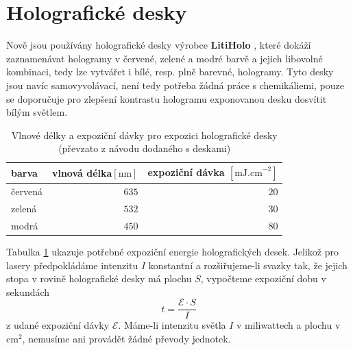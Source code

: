 \documentclass[twoside,project]{../MFFPrace}
\begin{document}
\section{Holografické desky}
Nově jsou používány holografické desky výrobce \textbf{LitiHolo} \cite{litiholo}, které dokáží zaznamenávat hologramy v červené, zelené a modré barvě a jejich libovolné kombinaci, tedy lze vytvářet i bílé, resp. plně barevné, hologramy. Tyto desky jsou navíc samovyvolávací, není tedy potřeba žádná práce s chemikáliemi, pouze se doporučuje pro zlepšení kontrastu hologramu exponovanou desku dosvítit bílým světlem.

\begin{table}
    \caption{Vlnové délky a expoziční dávky pro expozici holografické desky (převzato z návodu dodaného s deskami)}
    \centering
    \begin{tabular}{|l|r|r|}
        \hline
        \textbf{barva} & \textbf{vlnová délka}\footnotemark[1] $\left[\text{nm}\right]$ & \textbf{expoziční dávka} $\left[\text{mJ.cm}^{-2}\right]$ \\
        \hline
        červená        & $635$                                                          & $20$                                                      \\
        zelená         & $532$                                                          & $30$                                                      \\
        modrá          & $450$                                                          & $80$                                                      \\
        \hline
    \end{tabular}
    \label{tbl:expozicni-davky}
\end{table}

Tabulka \ref{tbl:expozicni-davky} ukazuje potřebné expoziční energie holografických desek. Jelikož pro lasery předpokládáme intenzitu $I$ konstantní a rozšiřujeme-li svazky tak, že jejich stopa v rovině holografické desky má plochu $S$, vypočteme expoziční dobu v sekundách
\begin{equation}
    t=\frac{\mathcal{E}\cdot S}{I}
    \label{eqn:expozicni-doba}
\end{equation}
z udané expoziční dávky $\mathcal{E}$. Máme-li intenzitu světla $I$ v miliwattech a plochu v $\text{cm}^2$, nemusíme ani provádět žádné převody jednotek.
\end{document}
